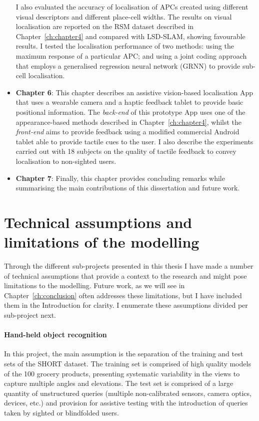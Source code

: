 \begin{itemize}
I also evaluated the accuracy of localisation of APCs created using different visual descriptors and different place\--cell widths. The results on visual localisation are reported on the RSM dataset described in Chapter~\ref{ch:chapter4} and compared with LSD-SLAM, showing favourable results. I tested the localisation performance of two methods: using the maximum response of a particular APC; and using a joint coding approach that employs a generalised regression neural network (GRNN) to provide sub-cell localisation.

\item \textbf{Chapter 6}: This chapter describes an assistive vision-based localisation App that uses a wearable camera and a haptic feedback tablet to provide basic positional information. The \textit{back-end} of this prototype App uses one of the appearance-based methods described in Chapter~\ref{ch:chapter4}, whilst the \textit{front-end} aims to provide feedback using a modified commercial Android tablet able to provide tactile cues to the user. I also describe the experiments carried out with 18 subjects on the quality of tactile feedback to convey localisation to non-sighted users.

\item \textbf{Chapter 7}: Finally, this chapter provides concluding remarks while summarising the main contributions of this dissertation and future work.

\end{itemize}

\section{Technical assumptions and limitations of the modelling}

Through the different sub-projects presented in this thesis I have made a number of technical assumptions that provide a context to the research and might pose limitations to the modelling. Future work, as we will see in Chapter~\ref{ch:conclusion} often addresses these limitations, but I have included them in the Introduction for clarity. I enumerate these assumptions divided per sub-project next.

\paragraph{Hand-held object recognition}
In this project, the main assumption is the separation of the training and test sets of the SHORT dataset. The training set is comprised of high quality models of the 100 grocery products, presenting systematic variability in the views to capture multiple angles and elevations. The test set is comprised of a large quantity of unstructured queries (multiple non-calibrated sensors, camera optics, devices, etc.) and provision for assistive testing with the introduction of queries taken by sighted or blindfolded users.


